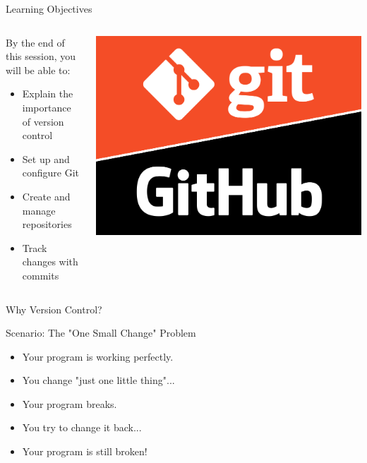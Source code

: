 \documentclass[aspectratio=169]{beamer}
\begin{document}
\begin{frame}{Learning Objectives}
  \begin{columns}
    \begin{column}{0.6\textwidth}
      \begin{block}{By the end of this session, you will be able to:}
        \begin{itemize}
          \item Explain the importance of version control
          \item Set up and configure Git
          \item Create and manage repositories
          \item Track changes with commits
        \end{itemize}
      \end{block}
    \end{column}
    \begin{column}{0.35\textwidth}
      \includegraphics[width=\textwidth]{figures/gitGithub.png}
    \end{column}
  \end{columns}
\end{frame}

\begin{frame}{Why Version Control?}
\begin{block}{Scenario: The "One Small Change" Problem}
\begin{itemize}
  \item Your program is working perfectly.
  \item You change "just one little thing"...
  \item Your program breaks.
  \item You try to change it back...
  \item \alert{Your program is still broken!}
\end{itemize}
\end{block}
\end{frame}
\end{document}
